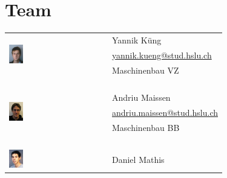 \newcommand{\figwidth}{0.15\textwidth}

\section{Team}

\begin{longtable}[l]{@{}p{}@{}p{}@{}}
    \\
    \multirow{3}{*}{\includegraphics[width=\figwidth]{../fig/tfkueng.png}}   & Yannik Küng \\
    & \href{mailto:yannik.kueng@stud.hslu.ch}{yannik.kueng@stud.hslu.ch} \\
    & Maschinenbau VZ \\
    & \\\\\\\\
    \multirow{3}{*}{\includegraphics[width=\figwidth]{../fig/mamaisse.png}} & Andriu Maissen \\
    & \href{mailto:andriu.maissen@stud.hslu.ch}{andriu.maissen@stud.hslu.ch} \\
    & Maschinenbau BB \\
    & \\\\\\\\
    \multirow{3}{*}{\includegraphics[width=\figwidth]{../fig/tfmathis.png}} & Daniel Mathis \\

\end{longtable}
